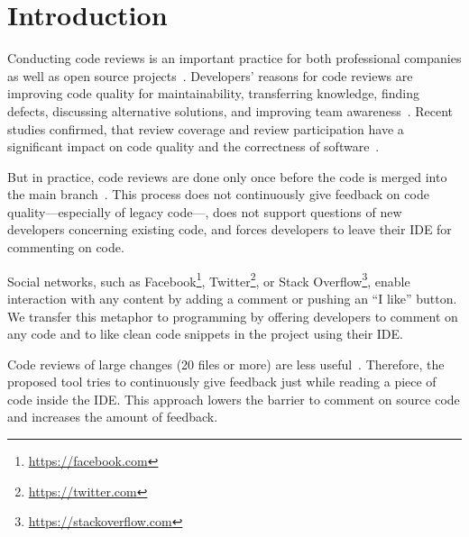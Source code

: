 
\section{Introduction}
Conducting code reviews is an important practice for both professional companies as well as open source projects~\cite{balachandran2013PeerCodeReviews, bird2015CodeReviewPlatform, rigby2013PeerCodeReviews, czerwonka2015codereviews, rigby2014PeerReviewOSS, feitelson2013development}.
%
Developers' reasons for code reviews are improving code quality for maintainability, transferring knowledge, finding defects, discussing alternative solutions, and improving team awareness~\cite{rigby2013PeerCodeReviews, bacchelli2013expectations, bosu2017ContemporaryCodeReview}.
%
Recent studies confirmed, that review coverage and review participation have a significant impact on code quality and the correctness of software~\cite{mcintosh2014impact, mcintosh2016empirical, thongtanunam2015CodeReviews, shimagaki2016CRInSony}. 
%

%
But in practice, code reviews are done only once before the code is merged into the main branch~\cite{rigby2013PeerCodeReviews}. 
%
This process does not continuously give feedback on code quality---especially of legacy code---, does not support questions of new developers concerning existing code, and forces developers to leave their IDE for commenting on code.
%

%
Social networks, such as Facebook\footnote{\url{https://facebook.com}}, Twitter\footnote{\url{https://twitter.com}}, or Stack Overflow\footnote{\url{https://stackoverflow.com}}, enable interaction with any content by adding a comment or pushing an \enquote{I like} button.
% 
We transfer this metaphor to programming by offering developers to comment on any code and to like clean code snippets in the project using their IDE.  
%

%
Code reviews of large changes (20 files or more) are less useful~\cite{czerwonka2015codereviews}.
%
Therefore, the proposed tool tries to continuously give feedback just while reading a piece of code inside the IDE. 
%
This approach lowers the barrier to comment on source code and increases the amount of feedback.
%
%